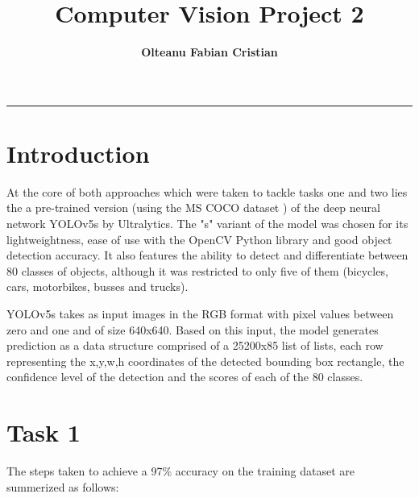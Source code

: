 \documentclass{article}
\author{\textbf{Olteanu Fabian Cristian}}
\affil{FMI, AI Master, Year 1
}
\title{\textbf{\huge Computer Vision Project 2}}
\date{}
\begin{document}
\pagestyle{headings}	
\newpage
\setcounter{page}{1}
\renewcommand{\thepage}{\arabic{page}}


	
	
\setlength{\parskip}{0.5em}
	
\maketitle
	
\noindent\rule{15cm}{0.4pt}

\section{Introduction}
At the core of both approaches which were taken to tackle tasks one and two lies the a pre-trained version (using the MS COCO dataset \cite{MSCOCO}) of the deep neural network YOLOv5s\cite{yolov5} by Ultralytics. The "s" variant of the model was chosen for its lightweightness, ease of use with the OpenCV Python library and good object detection accuracy. It also features the ability to detect and differentiate between 80 classes of objects, although it was restricted to only five of them (bicycles, cars, motorbikes, busses and trucks). 

YOLOv5s takes as input images in the RGB format with pixel values between zero and one and of size 640x640. Based on this input, the model generates prediction as a data structure comprised of a 25200x85 list of lists, each row representing the x,y,w,h coordinates of the detected bounding box rectangle, the confidence level of the detection and the scores of each of the 80 classes.

\section{Task 1}
The steps taken to achieve a 97\% accuracy on the training dataset are summerized as follows:
\end{document}
